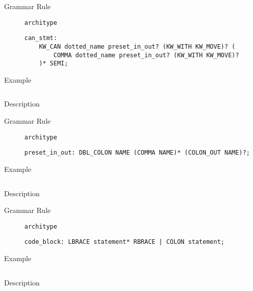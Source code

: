 \begin{description}
    \item[Grammar Rule] \texttt{architype}
          \begin{lstlisting}[style=gram]
can_stmt:
    KW_CAN dotted_name preset_in_out? (KW_WITH KW_MOVE)? (
        COMMA dotted_name preset_in_out? (KW_WITH KW_MOVE)?
    )* SEMI;
        \end{lstlisting}
    \item[Example] \texttt{}
          \begin{lstlisting}
        \end{lstlisting}

    \item[Description]
\end{description}


\begin{description}
    \item[Grammar Rule] \texttt{architype}
          \begin{lstlisting}[style=gram]
preset_in_out: DBL_COLON NAME (COMMA NAME)* (COLON_OUT NAME)?;
        \end{lstlisting}
    \item[Example] \texttt{}
          \begin{lstlisting}
        \end{lstlisting}

    \item[Description]
\end{description}


\begin{description}
    \item[Grammar Rule] \texttt{architype}
          \begin{lstlisting}[style=gram]
code_block: LBRACE statement* RBRACE | COLON statement;
        \end{lstlisting}
    \item[Example] \texttt{}
          \begin{lstlisting}
        \end{lstlisting}

    \item[Description]
\end{description}


